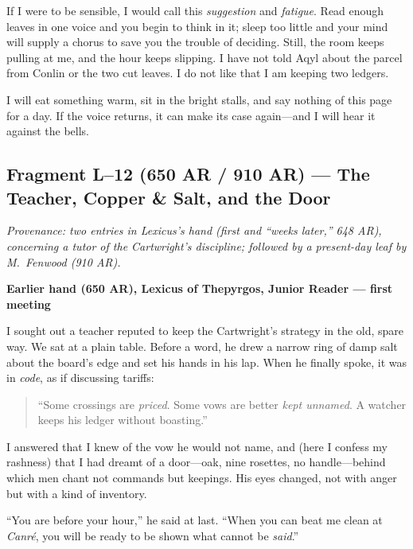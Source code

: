 \documentclass[11pt]{article}
\begin{document}
If I were to be sensible, I would call this \emph{suggestion} and \emph{fatigue}. Read enough leaves in one voice and you begin to think in it; sleep too little and your mind will supply a chorus to save you the trouble of deciding. Still, the room keeps pulling at me, and the hour keeps slipping. I have not told Aqyl about the parcel from Conlin or the two cut leaves. I do not like that I am keeping two ledgers.

I will eat something warm, sit in the bright stalls, and say nothing of this page for a day. If the voice returns, it can make its case again—and I will hear it against the bells.

\subsection{Fragment L--12 (650 AR / 910 AR) --- The Teacher, Copper \& Salt, and the Door}
\label{frag:l12}
{}

\noindent\textit{Provenance: two entries in Lexicus’s hand (first and “weeks later,” 648 AR), concerning a tutor of the Cartwright’s discipline; followed by a present-day leaf by M.\ Fenwood (910 AR).}

\medskip
\noindent\textbf{Earlier hand (650 AR), Lexicus of Thepyrgos, Junior Reader — first meeting}

I sought out a teacher reputed to keep the Cartwright’s strategy in the old, spare way. We sat at a plain table. Before a word, he drew a narrow ring of damp salt about the board’s edge and set his hands in his lap. When he finally spoke, it was in \emph{code}, as if discussing tariffs:

\begin{quote}\small
“Some crossings are \emph{priced}. Some vows are better \emph{kept unnamed}. A watcher keeps his ledger without boasting.”
\end{quote}

I answered that I knew of the vow he would not name, and (here I confess my rashness) that I had dreamt of a door—oak, nine rosettes, no handle—behind which men chant not commands but keepings. His eyes changed, not with anger but with a kind of inventory.

“You are before your hour,” he said at last. “When you can beat me clean at \textit{Canr\'e}, you will be ready to be shown what cannot be \emph{said}.”
\end{document}
